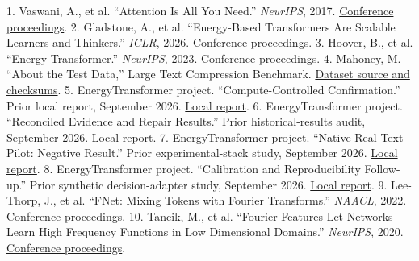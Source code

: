 \documentclass[11pt,letterpaper]{article}
\begin{document}
1. Vaswani, A., et al. “Attention Is All You Need.” \emph{NeurIPS}, 2017. \href{https://proceedings.neurips.cc/paper/2017/hash/3f5ee243547dee91fbd053c1c4a845aa-Abstract.html}{Conference proceedings}.
2. Gladstone, A., et al. “Energy-Based Transformers Are Scalable Learners and Thinkers.” \emph{ICLR}, 2026. \href{https://proceedings.iclr.cc/paper\_files/paper/2026/hash/e19a65fd53b6f9a88b354da98813465d-Abstract-Conference.html}{Conference proceedings}.
3. Hoover, B., et al. “Energy Transformer.” \emph{NeurIPS}, 2023. \href{https://proceedings.neurips.cc/paper\_files/paper/2023/hash/57a9b97477b67936298489e3c1417b0a-Abstract-Conference.html}{Conference proceedings}.
4. Mahoney, M. “About the Test Data,” Large Text Compression Benchmark. \href{https://mattmahoney.net/dc/textdata.html}{Dataset source and checksums}.
5. EnergyTransformer project. “Compute-Controlled Confirmation.” Prior local report, September 2026. \href{../reports/compute\_confirmation/REPORT.md}{Local report}.
6. EnergyTransformer project. “Reconciled Evidence and Repair Results.” Prior historical-results audit, September 2026. \href{../FINDINGS.md}{Local report}.
7. EnergyTransformer project. “Native Real-Text Pilot: Negative Result.” Prior experimental-stack study, September 2026. \href{../../EnergyTransformer-diffusion-state/reports/experimental\_stack/real\_text\_pilot\_001/REPORT.md}{Local report}.
8. EnergyTransformer project. “Calibration and Reproducibility Follow-up.” Prior synthetic decision-adapter study, September 2026. \href{../../EnergyTransformer-diffusion-state/reports/sentinel\_reasoning/POLISH.md}{Local report}.
9. Lee-Thorp, J., et al. “FNet: Mixing Tokens with Fourier Transforms.” \emph{NAACL}, 2022. \href{https://aclanthology.org/2022.naacl-main.319/}{Conference proceedings}.
10. Tancik, M., et al. “Fourier Features Let Networks Learn High Frequency Functions in Low Dimensional Domains.” \emph{NeurIPS}, 2020. \href{https://proceedings.neurips.cc/paper/2020/hash/55053683268957697aa39fba6f231c68-Abstract.html}{Conference proceedings}.
\end{document}
